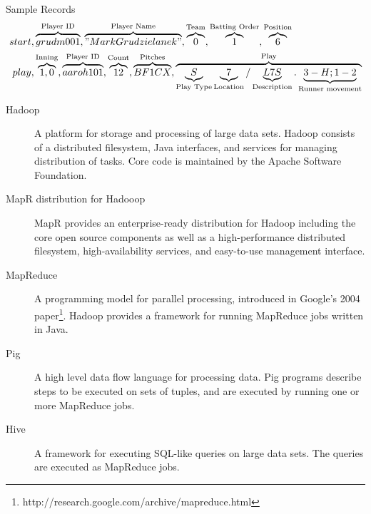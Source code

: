 \documentclass[10pt,letterpaper]{article}
\begin{document}
Sample Records
\begin{align}
start&,\overbrace{grudm001}^\text{Player ID},\overbrace{"Mark Grudzielanek"}^\text{Player Name},\overbrace{0}^\text{Team},\overbrace{1}^\text{Batting Order},\overbrace{6}^\text{Position} \nonumber \\
play&,\overbrace{1,0}^\text{Inning},\overbrace{aaroh101}^\text{Player ID},\overbrace{12}^\text{Count},\overbrace{BF1CX}^\text{Pitches},\overbrace{\underbrace{S}_\text{Play Type}\underbrace{7}_\text{Location}/\underbrace{L7S}_\text{Description}.\underbrace{3-H;1-2}_\text{Runner movement}}^\text{Play} \nonumber
\end{align}
\begin{description}
\item[Hadoop] A platform for storage and processing of large data sets. Hadoop consists of a distributed filesystem, Java interfaces, and services for managing distribution of tasks. Core code is maintained by the Apache Software Foundation.
\item[MapR distribution for Hadooop] MapR provides an enterprise-ready distribution for Hadoop including the core open source components as well as a high-performance distributed filesystem, high-availability services, and easy-to-use management interface.
\item[MapReduce] A programming model for parallel processing, introduced in Google's 2004 paper\footnote{http://research.google.com/archive/mapreduce.html}. Hadoop provides a framework for running MapReduce jobs written in Java.
\item[Pig] A high level data flow language for processing data. Pig programs describe steps to be executed on sets of tuples, and are executed by running one or more MapReduce jobs.
\item[Hive] A framework for executing SQL-like queries on large data sets. The queries are executed as MapReduce jobs.
\end{description}
\end{document}
